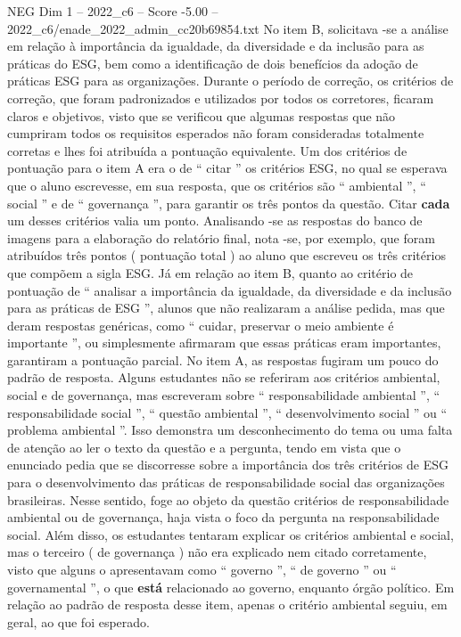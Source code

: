 \begin{textsample}{NEG Dim 1 – 2022\_c6 – Score -5.00 – 2022\_c6/enade\_2022\_admin\_cc20b69854.txt}
No item B, solicitava -se a análise em relação à importância da igualdade, da diversidade e da inclusão para as práticas do ESG, bem como a identificação de dois benefícios da adoção de práticas ESG para as organizações.
Durante o período de correção, os critérios de correção, que foram padronizados e utilizados por todos os corretores, ficaram claros e objetivos, visto que se verificou que algumas respostas que não cumpriram todos os requisitos esperados não foram consideradas totalmente corretas e lhes foi atribuída a pontuação equivalente.
Um dos critérios de pontuação para o item A era o de “ citar ” os critérios ESG, no qual se esperava que o aluno escrevesse, em sua resposta, que os critérios são “ ambiental ”, “ social ” e de “ governança ”, para garantir os três pontos da questão.
Citar \textbf{cada} um desses critérios valia um ponto.
Analisando -se as respostas do banco de imagens para a elaboração do relatório final, nota -se, por exemplo, que foram atribuídos três pontos ( pontuação total ) ao aluno que escreveu os três critérios que compõem a sigla ESG.
Já em relação ao item B, quanto ao critério de pontuação de “ analisar a importância da igualdade, da diversidade e da inclusão para as práticas de ESG ”, alunos que não realizaram a análise pedida, mas que deram respostas genéricas, como “ cuidar, preservar o meio ambiente é importante ”, ou simplesmente afirmaram que essas práticas eram importantes, garantiram a pontuação parcial.
No item A, as respostas fugiram um pouco do padrão de resposta.
Alguns estudantes não se referiram aos critérios ambiental, social e de governança, mas escreveram sobre “ responsabilidade ambiental ”, “ responsabilidade social ”, “ questão ambiental ”, “ desenvolvimento social ” ou “ problema ambiental ”.
Isso demonstra um desconhecimento do tema ou uma falta de atenção ao ler o texto da questão e a pergunta, tendo em vista que o enunciado pedia que se discorresse sobre a importância dos três critérios de ESG para o desenvolvimento das práticas de responsabilidade social das organizações brasileiras.
Nesse sentido, foge ao objeto da questão critérios de responsabilidade ambiental ou de governança, haja vista o foco da pergunta na responsabilidade social.
Além disso, os estudantes tentaram explicar os critérios ambiental e social, mas o terceiro ( de governança ) não era explicado nem citado corretamente, visto que alguns o apresentavam como “ governo ”, “ de governo ” ou “ governamental ”, o que \textbf{está} relacionado ao governo, enquanto órgão político.
Em relação ao padrão de resposta desse item, apenas o critério ambiental seguiu, em geral, ao que foi esperado.

\end{textsample}
